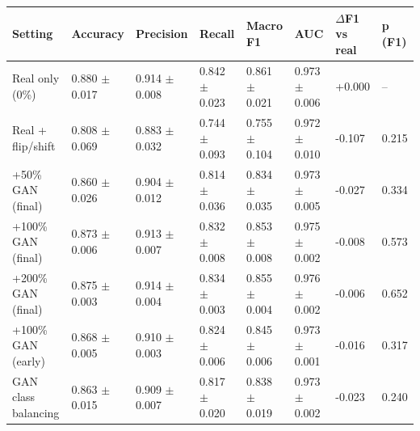 \begin{tabular}{llllllll}
\toprule
Setting & Accuracy & Precision & Recall & Macro F1 & AUC & $\Delta$F1 vs real & p (F1) \\
\midrule
Real only (0\%) & 0.880 $\pm$ 0.017 & 0.914 $\pm$ 0.008 & 0.842 $\pm$ 0.023 & 0.861 $\pm$ 0.021 & 0.973 $\pm$ 0.006 & +0.000 & -- \\
Real + flip/shift & 0.808 $\pm$ 0.069 & 0.883 $\pm$ 0.032 & 0.744 $\pm$ 0.093 & 0.755 $\pm$ 0.104 & 0.972 $\pm$ 0.010 & -0.107 & 0.215 \\
+50\% GAN (final) & 0.860 $\pm$ 0.026 & 0.904 $\pm$ 0.012 & 0.814 $\pm$ 0.036 & 0.834 $\pm$ 0.035 & 0.973 $\pm$ 0.005 & -0.027 & 0.334 \\
+100\% GAN (final) & 0.873 $\pm$ 0.006 & 0.913 $\pm$ 0.007 & 0.832 $\pm$ 0.008 & 0.853 $\pm$ 0.008 & 0.975 $\pm$ 0.002 & -0.008 & 0.573 \\
+200\% GAN (final) & 0.875 $\pm$ 0.003 & 0.914 $\pm$ 0.004 & 0.834 $\pm$ 0.003 & 0.855 $\pm$ 0.004 & 0.976 $\pm$ 0.002 & -0.006 & 0.652 \\
+100\% GAN (early) & 0.868 $\pm$ 0.005 & 0.910 $\pm$ 0.003 & 0.824 $\pm$ 0.006 & 0.845 $\pm$ 0.006 & 0.973 $\pm$ 0.001 & -0.016 & 0.317 \\
GAN class balancing & 0.863 $\pm$ 0.015 & 0.909 $\pm$ 0.007 & 0.817 $\pm$ 0.020 & 0.838 $\pm$ 0.019 & 0.973 $\pm$ 0.002 & -0.023 & 0.240 \\
\bottomrule
\end{tabular}
